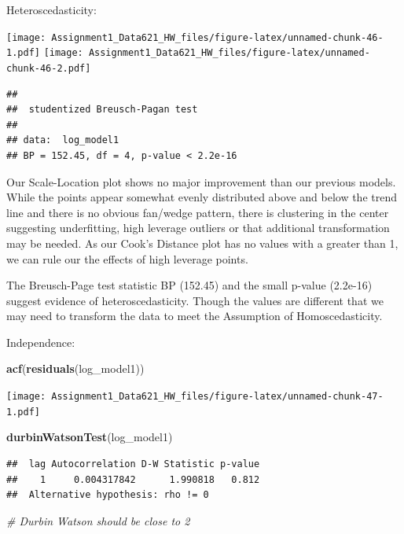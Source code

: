 \documentclass[
]{article}
\newenvironment{Shaded}{\begin{snugshade}}{\end{snugshade}}
\newcommand{\CommentTok}[1]{\textcolor[rgb]{0.56,0.35,0.01}{\textit{#1}}}
\newcommand{\FunctionTok}[1]{\textcolor[rgb]{0.13,0.29,0.53}{\textbf{#1}}}
\newcommand{\NormalTok}[1]{#1}
\begin{document}
Heteroscedasticity:

\texttt{[image: Assignment1\_Data621\_HW\_files/figure-latex/unnamed-chunk-46-1.pdf]}
\texttt{[image: Assignment1\_Data621\_HW\_files/figure-latex/unnamed-chunk-46-2.pdf]}

\begin{verbatim}
## 
##  studentized Breusch-Pagan test
## 
## data:  log_model1
## BP = 152.45, df = 4, p-value < 2.2e-16
\end{verbatim}

Our Scale-Location plot shows no major improvement than our previous
models. While the points appear somewhat evenly distributed above and
below the trend line and there is no obvious fan/wedge pattern, there is
clustering in the center suggesting underfitting, high leverage outliers
or that additional transformation may be needed. As our Cook's Distance
plot has no values with a greater than 1, we can rule our the effects of
high leverage points.

The Breusch-Page test statistic BP (152.45) and the small p-value
(2.2e-16) suggest evidence of heteroscedasticity. Though the values are
different that we may need to transform the data to meet the Assumption
of Homoscedasticity.

Independence:

\begin{Shaded}
\begin{Highlighting}[]
\FunctionTok{acf}\NormalTok{(}\FunctionTok{residuals}\NormalTok{(log\_model1))}
\end{Highlighting}
\end{Shaded}

\texttt{[image: Assignment1\_Data621\_HW\_files/figure-latex/unnamed-chunk-47-1.pdf]}

\begin{Shaded}
\begin{Highlighting}[]
\FunctionTok{durbinWatsonTest}\NormalTok{(log\_model1)}
\end{Highlighting}
\end{Shaded}

\begin{verbatim}
##  lag Autocorrelation D-W Statistic p-value
##    1     0.004317842      1.990818   0.812
##  Alternative hypothesis: rho != 0
\end{verbatim}

\begin{Shaded}
\begin{Highlighting}[]
\CommentTok{\# Durbin Watson should be close to 2}
\end{Highlighting}
\end{Shaded}
\end{document}
